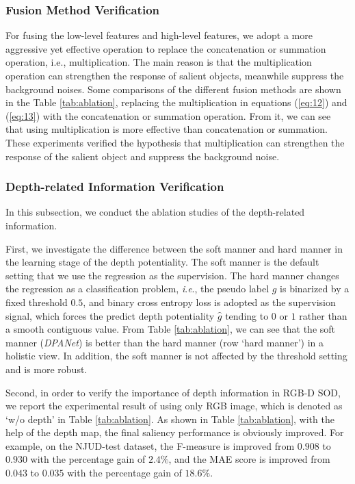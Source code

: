 \documentclass[journal]{IEEEtran}
\def\OURNET{\textit{DPANet}}
\newcommand{\ie}{\textit{i}.\textit{e}.}
\begin{document}
\subsubsection{\textbf{Fusion Method Verification}} For fusing the low-level features and high-level features, we adopt a more aggressive yet effective operation to replace the concatenation or summation operation, i.e., multiplication. The main reason is that the multiplication operation can strengthen the response of salient objects, meanwhile suppress the background noises. Some comparisons of the different fusion methods are shown in the Table \ref{tab:ablation}, replacing the multiplication in equations (\ref{eq:12}) and (\ref{eq:13}) with the concatenation or summation operation. From it, we can see that using multiplication is more effective than concatenation or summation. These experiments verified the hypothesis that multiplication can strengthen the response of the salient object and suppress the background noise.

\subsubsection{\textbf{Depth-related Information Verification}} In this subsection, we conduct the ablation studies of the depth-related information.

First, we investigate the difference between the soft manner and hard manner in the learning stage of the depth potentiality. The soft manner is the default setting that we use the regression as the supervision. The hard manner changes the regression as a classification problem, \ie, the pseudo label $g$ is binarized by a fixed threshold $0.5$, and binary cross entropy loss is adopted as the supervision signal, which forces the predict depth potentiality $\hat{g}$ tending to $0$ or $1$ rather than a smooth contiguous value. From Table \ref{tab:ablation}, we can see that the soft manner (\OURNET) is better than the hard manner (row `hard manner') in a holistic view. In addition, the soft manner is not affected by the threshold setting and is more robust.

Second, in order to verify the importance of depth information in RGB-D SOD, we report the experimental result of using only RGB image, which is denoted as `w/o depth' in Table \ref{tab:ablation}. As shown in Table \ref{tab:ablation}, with the help of the depth map, the final saliency performance is obviously improved. For example, on the NJUD-test dataset, the F-measure is improved from $0.908$ to $0.930$ with the percentage gain of $2.4\%$, and the MAE score is improved from $0.043$ to $0.035$ with the percentage gain of $18.6\%$.
\end{document}
